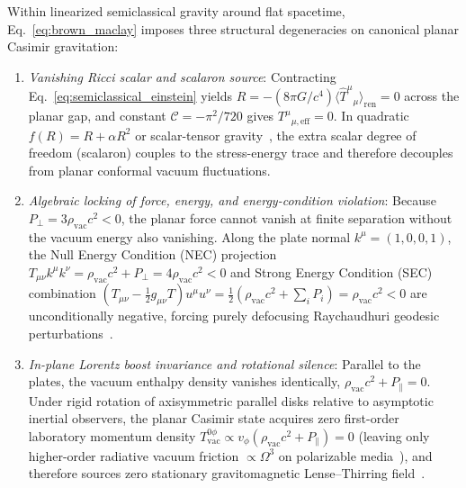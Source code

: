 \documentclass[aps,prd,twocolumn,10pt,showkeys,nofootinbib,floatfix,longbibliography]{revtex4-2}
\begin{document}
Within linearized semiclassical gravity around flat spacetime, Eq.~\eqref{eq:brown_maclay} imposes three structural degeneracies on canonical planar Casimir gravitation:
\begin{enumerate}
    \item \emph{Vanishing Ricci scalar and scalaron source}: Contracting Eq.~\eqref{eq:semiclassical_einstein} yields $R = -(8\pi G/c^4)\langle \hat{T}^\mu{}_\mu\rangle_{\mathrm{ren}} = 0$ across the planar gap, and constant $\mathcal{C} = -\pi^2/720$ gives $T^\mu{}_{\mu,\mathrm{eff}} = 0$. In quadratic $f(R) = R + \alpha R^2$ or scalar-tensor gravity~\cite{starobinsky1980,damour1992,defelice2010,berry2011,pourhassan2025epjc}, the extra scalar degree of freedom (scalaron) couples to the stress-energy trace and therefore decouples from planar conformal vacuum fluctuations.
    \item \emph{Algebraic locking of force, energy, and energy-condition violation}: Because $P_\perp = 3\rho_{\mathrm{vac}} c^2 < 0$, the planar force cannot vanish at finite separation without the vacuum energy also vanishing. Along the plate normal $k^\mu = (1,0,0,1)$, the Null Energy Condition (NEC) projection $T_{\mu\nu}k^\mu k^\nu = \rho_{\mathrm{vac}}c^2 + P_\perp = 4\rho_{\mathrm{vac}}c^2 < 0$ and Strong Energy Condition (SEC) combination $(T_{\mu\nu} - \frac{1}{2}g_{\mu\nu}T)u^\mu u^\nu = \frac{1}{2}(\rho_{\mathrm{vac}}c^2 + \sum_i P_i) = \rho_{\mathrm{vac}}c^2 < 0$ are unconditionally negative, forcing purely defocusing Raychaudhuri geodesic perturbations~\cite{raychaudhuri1955,kontou2020}.
    \item \emph{In-plane Lorentz boost invariance and rotational silence}: Parallel to the plates, the vacuum enthalpy density vanishes identically, $\rho_{\mathrm{vac}}c^2 + P_\parallel = 0$. Under rigid rotation of axisymmetric parallel disks relative to asymptotic inertial observers, the planar Casimir state acquires zero first-order laboratory momentum density $T^{0\phi}_{\mathrm{vac}} \propto v_\phi(\rho_{\mathrm{vac}}c^2 + P_\parallel) = 0$ (leaving only higher-order radiative vacuum friction $\propto \Omega^3$ on polarizable media~\cite{manjavacas2010,maghrebi2012}), and therefore sources zero stationary gravitomagnetic Lense--Thirring field~\cite{ciufolini2004,mashhoon2007,costa2014grg,costa2021universe}.
\end{enumerate}
\end{document}
